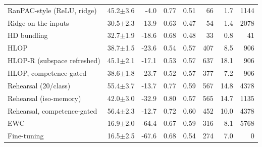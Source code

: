 \begin{tabular}{lrrrrrrr}
RanPAC-style (ReLU, ridge) & 45.2{\tiny$\pm$3.6} & -4.0 & 0.77 & 0.51 & 66 & 1.7 & 1144 \\
Ridge on the inputs & 30.5{\tiny$\pm$2.3} & -13.9 & 0.63 & 0.47 & 54 & 1.4 & 2078 \\
HD bundling & 32.7{\tiny$\pm$1.9} & -18.6 & 0.68 & 0.48 & 33 & 0.8 & 41 \\
HLOP & 38.7{\tiny$\pm$1.5} & -23.6 & 0.54 & 0.57 & 407 & 8.5 & 906 \\
HLOP-R (subspace refreshed) & 45.1{\tiny$\pm$2.1} & -17.1 & 0.53 & 0.57 & 637 & 18.1 & 906 \\
HLOP, competence-gated & 38.6{\tiny$\pm$1.8} & -23.7 & 0.52 & 0.57 & 377 & 7.2 & 906 \\
Rehearsal (20/class) & 55.4{\tiny$\pm$3.7} & -13.7 & 0.77 & 0.59 & 567 & 14.8 & 4378 \\
Rehearsal (iso-memory) & 42.0{\tiny$\pm$3.0} & -32.9 & 0.80 & 0.57 & 565 & 14.7 & 1135 \\
Rehearsal, competence-gated & 56.4{\tiny$\pm$2.3} & -12.7 & 0.72 & 0.60 & 452 & 10.0 & 4378 \\
EWC & 16.9{\tiny$\pm$2.0} & -64.4 & 0.67 & 0.59 & 316 & 8.1 & 5768 \\
Fine-tuning & 16.5{\tiny$\pm$2.5} & -67.6 & 0.68 & 0.54 & 274 & 7.0 & 0 \\
\bottomrule
\end{tabular}
